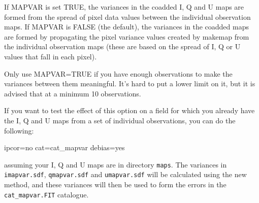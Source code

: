 If MAPVAR is set TRUE, the variances in the coadded I, Q and U maps are
formed from the spread of pixel data values between the individual
observation maps. If MAPVAR is FALSE (the default), the variances in the
coadded maps are formed by propagating the pixel variance values created
by makemap from the individual observation maps (these are based on the
spread of I, Q or U values that fall in each pixel).

Only use MAPVAR=TRUE if you have enough observations to
make the variances between them meaningful. It's hard to put a lower
limit on it, but it is advised that at a minimum 10 observations.


If you want to test the effect of this option on a field for which you
already have the I, Q and U maps from a set of individual
observations, you can do the following:

\begin{terminalv}
                   ipcor=no cat=cat_mapvar debias=yes
\end{terminalv}

assuming your I, Q and U maps are in directory \texttt{maps}. The
variances in \texttt{imapvar.sdf}, \texttt{qmapvar.sdf} and
\texttt{umapvar.sdf} will be calculated using the new method, and these
variances will then be used to form the errors in the
\texttt{cat\_mapvar.FIT} catalogue.



